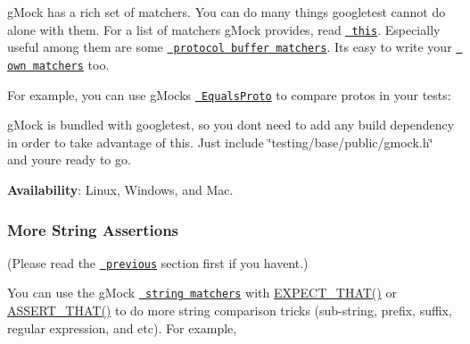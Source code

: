 g\+Mock has a rich set of matchers. You can do many things googletest cannot do alone with them. For a list of matchers g\+Mock provides, read \href{../../googlemock/docs/CookBook.md\#using-matchers}{\texttt{ this}}. Especially useful among them are some \href{https://github.com/google/nucleus/blob/master/nucleus/testing/protocol-buffer-matchers.h}{\texttt{ protocol buffer matchers}}. It\textquotesingle{}s easy to write your \href{../../googlemock/docs/CookBook.md\#writing-new-matchers-quickly}{\texttt{ own matchers}} too.

For example, you can use g\+Mock\textquotesingle{}s \href{https://github.com/google/nucleus/blob/master/nucleus/testing/protocol-buffer-matchers.h}{\texttt{ Equals\+Proto}} to compare protos in your tests\+:


\begin{DoxyCode}{0}
\end{DoxyCode}


g\+Mock is bundled with googletest, so you don\textquotesingle{}t need to add any build dependency in order to take advantage of this. Just include {\ttfamily \char`\"{}testing/base/public/gmock.\+h\char`\"{}} and you\textquotesingle{}re ready to go.

{\bfseries{Availability}}\+: Linux, Windows, and Mac.

\subsubsection*{More String Assertions}

(Please read the \href{\#asserting-using-gmock-matchers}{\texttt{ previous}} section first if you haven\textquotesingle{}t.)

You can use the g\+Mock \href{../../googlemock/docs/CheatSheet.md\#string-matchers}{\texttt{ string matchers}} with {\ttfamily \mbox{\hyperlink{googletest-master_2googlemock_2include_2gmock_2gmock-matchers_8h_ac31e206123aa702e1152bb2735b31409}{E\+X\+P\+E\+C\+T\+\_\+\+T\+H\+A\+T()}}} or {\ttfamily \mbox{\hyperlink{googletest-master_2googlemock_2include_2gmock_2gmock-matchers_8h_a41d888579850c16583baea33ee8d057e}{A\+S\+S\+E\+R\+T\+\_\+\+T\+H\+A\+T()}}} to do more string comparison tricks (sub-\/string, prefix, suffix, regular expression, and etc). For example,


